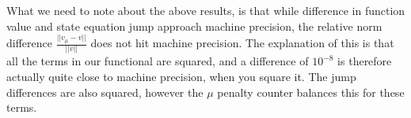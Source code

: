 \\
\\
What we need to note about the above results, is that while difference in function value and state equation jump approach machine precision, the relative norm difference $\frac{||v_{\mu}-v||}{||v||}$ does not hit machine precision. The explanation of this is that all the terms in our functional are squared, and a difference of $10^{-8}$ is therefore actually quite close to machine precision, when you square it. The jump differences are also squared, however the $\mu$ penalty counter balances this for these terms.

